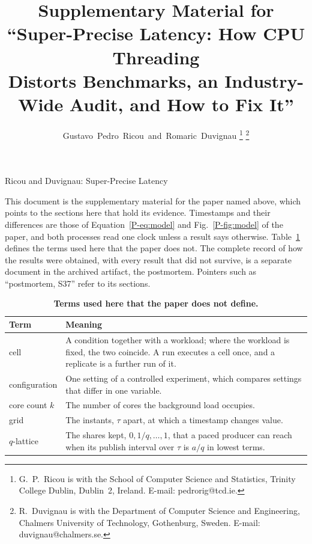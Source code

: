 \documentclass[10pt,journal,onecolumn]{IEEEtran}
\begin{document}
\title{Supplementary Material for ``Super-Precise Latency: How CPU Threading\\
Distorts Benchmarks, an Industry-Wide Audit, and How to Fix It''}
\author{Gustavo~Pedro~Ricou~and~Romaric~Duvignau%
\thanks{G.~P.~Ricou is with the School of Computer Science and Statistics, Trinity College
Dublin, Dublin~2, Ireland. E-mail: pedrorig@tcd.ie.}%
\thanks{R.~Duvignau is with the Department of Computer Science and Engineering, Chalmers
University of Technology, Gothenburg, Sweden. E-mail: duvignau@chalmers.se.}}

%
{Ricou and Duvignau: Super-Precise Latency}

\maketitle

This document is the supplementary material for the paper named above, which points to the
sections here that hold its evidence. Timestamps and their differences are those of
Equation~\ref{P-eq:model} and Fig.~\ref{P-fig:model} of the paper, and both processes read one
clock unless a result says otherwise. Table~\ref{stab:glossary} defines the terms used here that
the paper does not. The complete record of how the results were obtained, with every result that
did not survive, is a separate document in the archived artifact, the postmortem. Pointers such
as ``postmortem, S37'' refer to its sections.

\begin{table}[tb]
\caption{\textbf{Terms used here that the paper does not define.}}
\label{stab:glossary}
\centering
\small
\begin{tabular}{@{}p{}p{}@{}}
\toprule
Term & Meaning \\
\midrule
cell & A condition together with a workload; where the workload is fixed, the two coincide. A
run executes a cell once, and a replicate is a further run of it. \\
configuration & One setting of a controlled experiment, which compares settings that differ in
one variable. \\
core count $k$ & The number of cores the background load occupies. \\
grid & The instants, $\tau$ apart, at which a timestamp changes value. \\
$q$-lattice & The shares kept, $0, 1/q, \ldots, 1$, that a paced producer can reach when its publish
interval over $\tau$ is $a/q$ in lowest terms. \\
\bottomrule
\end{tabular}
\end{table}
\end{document}
